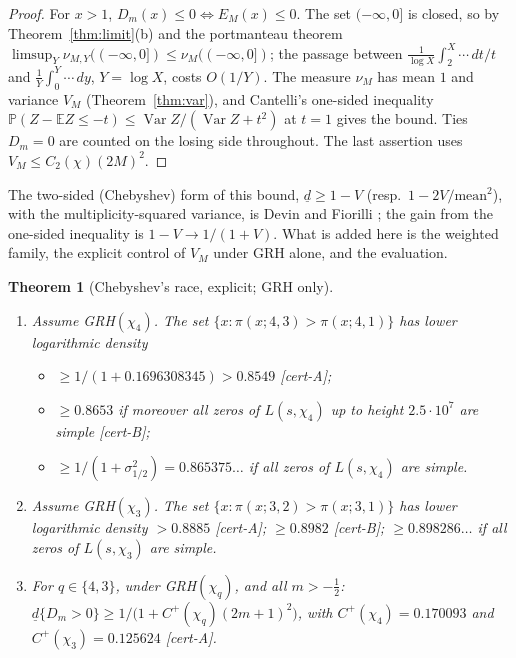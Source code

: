 \documentclass[11pt]{amsart}
\newtheorem{theorem}{Theorem}[section]
\theoremstyle{definition}
\numberwithin{equation}{section}
\newcommand{\PP}{\mathbb P}
\newcommand{\EE}{\mathbb E}
\newcommand{\dlow}{\underline{d}}
\newcommand{\certA}{\textsf{[cert-A]}}
\newcommand{\certB}{\textsf{[cert-B]}}
\begin{document}
\begin{proof}
For $x>1$, $D_m(x)\le0\iff E_M(x)\le0$. The set $(-\infty,0]$ is
closed, so by Theorem~\ref{thm:limit}(b) and the portmanteau theorem
$\limsup_Y\nu_{M,Y}((-\infty,0])\le\nu_M((-\infty,0])$; the passage
between $\frac1{\log X}\int_2^X\cdots\,dt/t$ and
$\frac1Y\int_0^Y\cdots\,dy$, $Y=\log X$, costs $O(1/Y)$. The measure
$\nu_M$ has mean $1$ and variance $V_M$ (Theorem~\ref{thm:var}), and
Cantelli's one-sided inequality
$\PP(Z-\EE Z\le-t)\le\operatorname{Var}Z/(\operatorname{Var}Z+t^2)$
at $t=1$ gives the bound. Ties $D_m=0$ are counted on the losing
side throughout. The last assertion uses $V_M\le C_2(\chi)(2M)^2$.
\end{proof}

The two-sided (Chebyshev) form of this bound, $\dlow\ge1-V$ (resp.\
$1-2V/\mathrm{mean}^2$), with the multiplicity-squared variance, is
Devin \cite[Corollary~5.8]{Dev20} and Fiorilli
\cite[Lemma~2.7]{Fio14}; the gain from the one-sided inequality is
$1-V\to1/(1+V)$. What is added here is the weighted family, the
explicit control of $V_M$ under GRH alone, and the evaluation.

\begin{theorem}[Chebyshev's race, explicit; GRH only]
\label{thm:cantelli-q}
\begin{enumerate}
\item[(a)] Assume GRH$(\chi_4)$. The set
$\{x:\pi(x;4,3)>\pi(x;4,1)\}$ has lower logarithmic density
\begin{itemize}
\item[] $\ge1/(1+0.1696308345)>0.8549$ \certA;
\item[] $\ge0.8653$ if moreover all zeros of $L(s,\chi_4)$ up to
height $2.5\cdot10^7$ are simple \certB;
\item[] $\ge1/(1+\sigma_{1/2}^2)=0.865375\ldots$ if all zeros of
$L(s,\chi_4)$ are simple.
\end{itemize}
\item[(b)] Assume GRH$(\chi_3)$. The set
$\{x:\pi(x;3,2)>\pi(x;3,1)\}$ has lower logarithmic density
$>0.8885$ \certA; $\ge0.8982$ \certB; $\ge0.898286\ldots$ if all
zeros of $L(s,\chi_3)$ are simple.
\item[(c)] For $q\in\{4,3\}$, under GRH$(\chi_q)$, and all
$m>-\tfrac12$:
$\dlow\{D_m>0\}\ge1/\bigl(1+C^+(\chi_q)(2m+1)^2\bigr)$, with
$C^+(\chi_4)=0.170093$ and $C^+(\chi_3)=0.125624$ \certA.
\end{enumerate}
\end{theorem}
\end{document}
